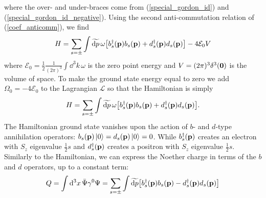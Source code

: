 where the over- and under-braces come from (\ref{special_gordon_id}) and (\ref{special_gordon_id_negative}). Using the second anti-commutation relation of (\ref{coef_anticomm}), we find
\begin{equation}
    H=\sum_{s=\pm}\int\widetilde{\dd p}\,\omega\qty[b_s^\dagger(\vb{p})b_s(\vb{p})+d_s^\dagger(\vb{p})d_s(\vb{p})]-4\mathcal{E}_0V
\end{equation}
where $\mathcal{E}_0=\frac{1}{2}\frac{1}{(2\pi)^3}\int\dd^3 k\, \omega$ is the zero point energy and $V=(2\pi)^3\delta^3(\vb{0})$ is the volume of space. To make the ground state energy equal to zero we add $\Omega_0=-4\mathcal{E}_0$ to the Lagrangian $\mathcal{L}$ so that the Hamiltonian is simply\begin{equation}
    H=\sum_{s=\pm}\int\widetilde{\dd p}\,\omega\qty[b_s^\dagger(\vb{p})b_s(\vb{p})+d_s^\dagger(\vb{p})d_s(\vb{p})].
\end{equation}
The Hamiltonian ground state vanishes upon the action of $b$- and $d$-type annihilation operators: $b_s(\vb{p})\ket{0}=d_s(\vb{p})\ket{0}=0$. While  $b^\dagger_s(\vb{p})$ creates an electron with $S_z$ eigenvalue $\frac{1}{2}s$ and $d^\dagger_s(\vb{p})$ creates a positron with $S_z$ eigenvalue $\frac{1}{2}s$. Similarly to the Hamiltonian, we can express the Noether charge in terms of the $b$ and $d$ operators, up to a constant term:
\begin{equation}
    Q=\int\dd^3 x\, \bar{\Psi}\gamma^0\Psi=\sum_{s=\pm}\int\widetilde{\dd p}\qty[b_s^\dagger(\vb{p})b_s(\vb{p})-d_s^\dagger(\vb{p})d_s(\vb{p})]
\end{equation}



